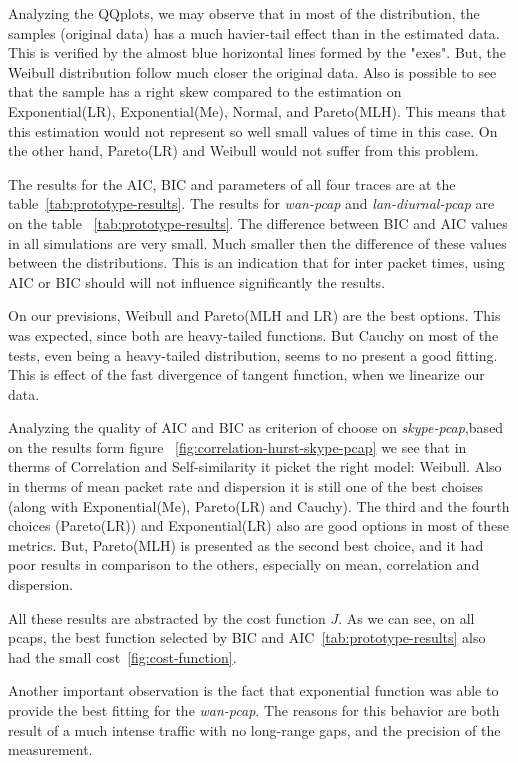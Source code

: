 Analyzing the QQplots, we may observe that in most of the distribution, the samples (original data) has a much havier-tail effect than in the estimated data. This is verified by the almost blue horizontal lines formed by the "exes". But, the Weibull distribution follow much closer the original data. Also is possible to see that the sample has a right skew compared to the estimation on Exponential(LR), Exponential(Me), Normal, and Pareto(MLH). This means that this estimation would not represent so well small values of time in this case. On the other hand, Pareto(LR) and Weibull would not suffer from this problem.

The results for the AIC, BIC and parameters of all four traces are at the table~\ref{tab:prototype-results}.  The results for \textit{wan-pcap} and \textit{lan-diurnal-pcap} are on the table ~\ref{tab:prototype-results}. The difference between BIC and AIC values in all simulations are very small. Much smaller then the difference of these values between the distributions. This is an indication that for inter packet times, using AIC or BIC should will not influence significantly the results. 

On our previsions, Weibull and Pareto(MLH and LR) are the best options. This was expected, since both are heavy-tailed functions. But Cauchy on most of the tests, even being a heavy-tailed distribution, seems to no present a good fitting. This is effect of the fast divergence of tangent function, when we linearize our data. 

Analyzing the quality of AIC and BIC as criterion of choose on \textit{skype-pcap},based on the results form figure ~\ref{fig:correlation-hurst-skype-pcap} we see that in therms of Correlation and Self-similarity it picket the right model: Weibull. Also in therms of mean packet rate and dispersion it is still one of the best choises (along with Exponential(Me), Pareto(LR) and Cauchy). The third and the fourth choices (Pareto(LR)) and Exponential(LR) also are good options in most of these metrics. But, Pareto(MLH) is presented as the second best choice, and it had poor results in comparison to the others, especially on mean, correlation and dispersion. 

All these results are abstracted by the cost function $J$. As we can see, on all pcaps, the best function selected by BIC and AIC~\ref{tab:prototype-results} also had the small cost~\ref{fig:cost-function}. 

Another important observation is the fact that exponential function was able to provide the best fitting for the \textit{wan-pcap}. The reasons for this behavior are both result of a much intense traffic with no long-range gaps, and the precision of the measurement.

